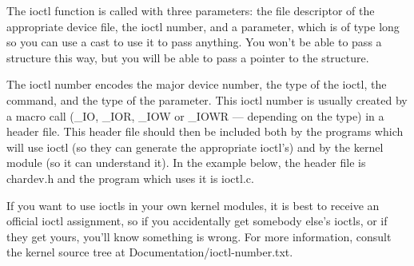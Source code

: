 \documentclass[11pt]{article}
\begin{document}
The ioctl function is called with three parameters: the file descriptor of the appropriate device file, the ioctl number, and a parameter, which is of type long so you can use a cast to use it to pass anything. You won't be able to pass a structure this way, but you will be able to pass a pointer to the structure.

The ioctl number encodes the major device number, the type of the ioctl, the command, and the type of the parameter. This ioctl number is usually created by a macro call (\_IO, \_IOR, \_IOW or \_IOWR --- depending on the type) in a header file. This header file should then be included both by the programs which will use ioctl (so they can generate the appropriate ioctl's) and by the kernel module (so it can understand it). In the example below, the header file is chardev.h and the program which uses it is ioctl.c.

If you want to use ioctls in your own kernel modules, it is best to receive an official ioctl assignment, so if you accidentally get somebody else's ioctls, or if they get yours, you'll know something is wrong. For more information, consult the kernel source tree at Documentation/ioctl-number.txt.
\end{document}
